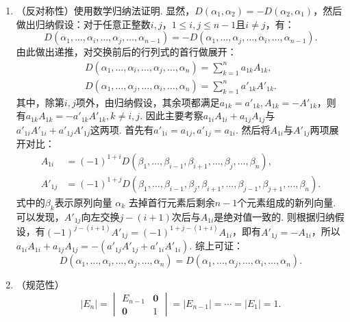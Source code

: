 \begin{exercise}
\begin{exgroup}
\begin{answer}
\begin{enumerate}
\begin{enumerate}
                        \item （反对称性）使用数学归纳法证明. 显然，$D(\alpha_1,\alpha_2)=-D(\alpha_2,\alpha_1)$，然后做出归纳假设：对于任意正整数$i,j$，$1 \leqslant i, j \leqslant n - 1$且$i \neq j$，有：
                            \[ D(\alpha_1,\ldots,\alpha_i,\ldots,\alpha_j,\ldots,\alpha_{n-1})=-D(\alpha_1,\ldots,\alpha_j,\ldots,\alpha_i,\ldots,\alpha_{n-1}). \]
                            由此做出递推，对交换前后的行列式的首行做展开：
                            \begin{gather*}
                                D(\alpha_1,\ldots,\alpha_{i},\ldots,\alpha_{j},\ldots,\alpha_n)
                                 =\sum_{k=1}^{n}a_{1k}A_{1k},   \\
                                D(\alpha_1,\ldots,\alpha_{j},\ldots,\alpha_{i},\ldots,\alpha_n)
                                 =\sum_{k=1}^{n}a'_{1k}A'_{1k}.
                            \end{gather*}
                            其中，除第$i,j$项外，由归纳假设，其余项都满足$a_{1k}=a'_{1k},A_{1k}=-A'_{1k}$，则有$a_{1k}A_{1k}=-a'_{1k}A'_{1k},k\neq i,j$. 因此主要考察$a_{1i}A_{1i}+a_{1j}A_{1j}$与$a'_{1i}A'_{1i}+a'_{1j}A'_{1j}$这两项. 首先有$a'_{1i}=a_{1j},a'_{1j}=a_{1i}$. 然后将$A_{1i}$与$A'_{1j}$两项展开对比：
                            \begin{align*}
                                A_{1i}  & =(-1)^{1+i} D(\beta_{1},\ldots,\beta_{i-1},\beta_{i+1},\ldots,\beta_{j},\ldots,\beta_{n}),                             \\
                                A'_{1j} & =(-1)^{1+j} D(\beta_{1},\ldots,\beta_{i-1},\beta_{j},\beta_{i+1},\ldots,\beta_{j-1},\beta_{j+1},\ldots,\beta_{n}).
                            \end{align*}
                            式中的$\beta_k$表示原列向量 $\alpha_k$ 去掉首行元素后剩余$n-1$个元素组成的新列向量. 可以发现，$A'_{1j}$向左交换$j-(i+1)$次后与$A_{1i}$是绝对值一致的. 则根据归纳假设，有$(-1)^{j-(i+1)}A'_{1j}=(-1)^{1+j-(1+i)}A_{1i}$，即有$A'_{1j}=-A_{1i}$，所以$a_{1i}A_{1i}+a_{1j}A_{1j}=-(a'_{1j}A'_{1j}+a'_{1i}A'_{1i})$. 综上可证：
                            \[ D(\alpha_1,\ldots,\alpha_{i},\ldots,\alpha_{j},\ldots,\alpha_n)=D(\alpha_1,\ldots,\alpha_{j},\ldots,\alpha_{i},\ldots,\alpha_n). \]

                        \item （规范性）
                            \[
                                |E_n| = \begin{vmatrix}
                                    E_{n-1}    & \mathbf{0} \\
                                    \mathbf{0} & 1
                                \end{vmatrix} = |E_{n-1}| = \cdots = |E_1| = 1.
                            \]
                    \end{enumerate}


\end{enumerate}
\end{answer}
\end{exgroup}
\end{exercise}

